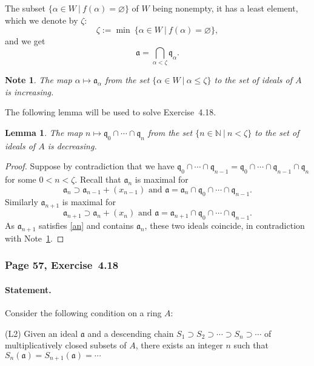 \documentclass[12pt,letterpaper]{article}%
\newcommand{\mf}{\mathfrak}
\newcommand{\aaa}{\mf a}
\newcommand{\qqq}{\mf q}
\newcommand{\nn}{\noindent}
\newtheorem{lem}[thm]{Lemma}
\newtheorem{note}[thm]{Note}
\begin{document}
The subset $\{\alpha\in W\ |\ f(\alpha)=\varnothing\}$ of $W$ being nonempty, it has a least element, which we denote by $\zeta$:  
\begin{equation}\label{zeta}
\zeta:=\min\ \{\alpha\in W\ |\ f(\alpha)=\varnothing\},
\end{equation} 
and we get 
\begin{equation}\label{abak}
\aaa=\bigcap_{\alpha<\zeta}\qqq_\alpha.
\end{equation} 
\begin{note}\label{amaa}
The map $\alpha\mapsto\aaa_\alpha$ from the set $\{\alpha\in W\ |\ \alpha\le\zeta\}$ to the set of ideals of $A$ is increasing.
\end{note} 
The following lemma will be used to solve Exercise~4.18. 
\begin{lem}\label{lasker}
The map $n\mapsto\qqq_0\cap\cdots\cap\qqq_n$ from the set $\{n\in\mathbb N\ |\ n<\zeta\}$ to the set of ideals of $A$ is decreasing.
\end{lem}
\begin{proof}
Suppose by contradiction that we have $\qqq_0\cap\cdots\cap\qqq_{n-1}=\qqq_0\cap\cdots\cap\qqq_{n-1}\cap\qqq_n$ for some $0<n<\zeta$. Recall that $\aaa_n$ is maximal for 
\begin{equation}\label{an}
\aaa_n\supset\aaa_{n-1}+(x_{n-1})\text{ and }\aaa=\aaa_n\cap\qqq_0\cap\cdots\cap\qqq_{n-1}.
\end{equation} 
Similarly $\aaa_{n+1}$ is maximal for 
$$
\aaa_{n+1}\supset\aaa_n+(x_n)\text{ and }\aaa=\aaa_{n+1}\cap\qqq_0\cap\cdots\cap\qqq_{n-1}.
$$ 
As $\aaa_{n+1}$ satisfies \eqref{an} and contains $\aaa_n$, these two ideals coincide, in contradiction with Note~\ref{amaa}. 
\end{proof}

\subsubsection{Page 57, Exercise~4.18}%

\paragraph{Statement.}%

Consider the following condition on a ring $A$:

\nn(L2) Given an ideal $\mathfrak a$ and a descending chain $S_1\supset S_2\supset\cdots\supset S_n\supset\cdots$ of multiplicatively closed subsets of $A$, there exists an integer $n$ such that $S_n(\mathfrak a)=S_{n+1}(\mathfrak a)=\cdots$ 
\end{document}
